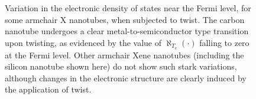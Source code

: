 \documentclass[preprint,12pt, 3p, sort&compress]{elsarticle}
\begin{document}
\begin{figure}[!ht]
\centering
{}\quad
{}
\caption{{Variation in the electronic density of states near the Fermi level, for some armchair X nanotubes, when subjected to twist. The carbon nanotube undergoes a clear metal-to-semiconductor type transition upon twisting, as evidenced by the value of $\aleph_{T_{\text{e}}}(\cdot)$ falling to zero at the Fermi level. Other armchair Xene nanotubes (including the silicon nanotube shown here) do not show such stark variations, although changes in the electronic structure are clearly induced by the application of twist.}}
\label{fig:Density_of_States}
\end{figure}
              
\end{document}
